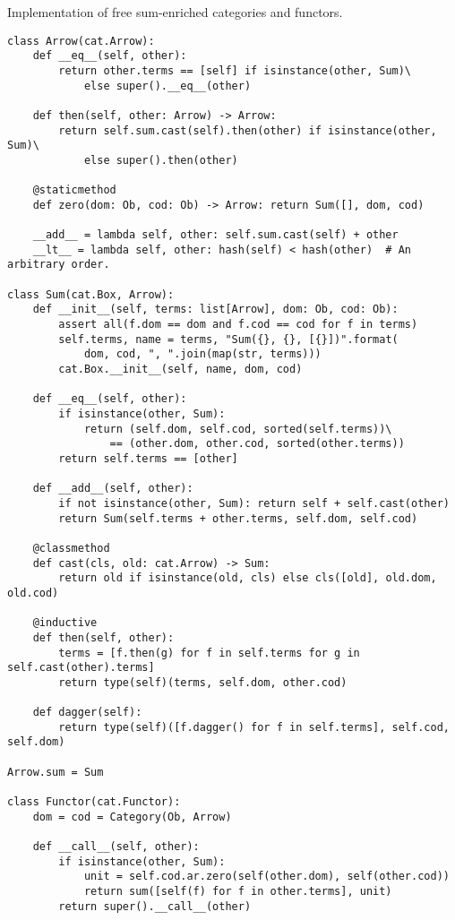 \begin{python}
{\normalfont Implementation of free sum-enriched categories and functors.}

\begin{verbatim}
class Arrow(cat.Arrow):
    def __eq__(self, other):
        return other.terms == [self] if isinstance(other, Sum)\
            else super().__eq__(other)

    def then(self, other: Arrow) -> Arrow:
        return self.sum.cast(self).then(other) if isinstance(other, Sum)\
            else super().then(other)

    @staticmethod
    def zero(dom: Ob, cod: Ob) -> Arrow: return Sum([], dom, cod)

    __add__ = lambda self, other: self.sum.cast(self) + other
    __lt__ = lambda self, other: hash(self) < hash(other)  # An arbitrary order.

class Sum(cat.Box, Arrow):
    def __init__(self, terms: list[Arrow], dom: Ob, cod: Ob):
        assert all(f.dom == dom and f.cod == cod for f in terms)
        self.terms, name = terms, "Sum({}, {}, [{}])".format(
            dom, cod, ", ".join(map(str, terms)))
        cat.Box.__init__(self, name, dom, cod)

    def __eq__(self, other):
        if isinstance(other, Sum):
            return (self.dom, self.cod, sorted(self.terms))\
                == (other.dom, other.cod, sorted(other.terms))
        return self.terms == [other]

    def __add__(self, other):
        if not isinstance(other, Sum): return self + self.cast(other)
        return Sum(self.terms + other.terms, self.dom, self.cod)

    @classmethod
    def cast(cls, old: cat.Arrow) -> Sum:
        return old if isinstance(old, cls) else cls([old], old.dom, old.cod)

    @inductive
    def then(self, other):
        terms = [f.then(g) for f in self.terms for g in self.cast(other).terms]
        return type(self)(terms, self.dom, other.cod)

    def dagger(self):
        return type(self)([f.dagger() for f in self.terms], self.cod, self.dom)

Arrow.sum = Sum

class Functor(cat.Functor):
    dom = cod = Category(Ob, Arrow)

    def __call__(self, other):
        if isinstance(other, Sum):
            unit = self.cod.ar.zero(self(other.dom), self(other.cod))
            return sum([self(f) for f in other.terms], unit)
        return super().__call__(other)
\end{verbatim}
\end{python}

